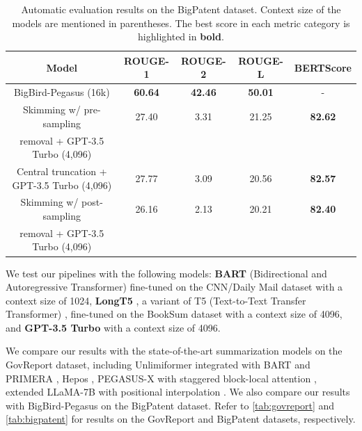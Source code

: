 	\begin{table}[!ht]
		\centering

		\begin{tabular}{c c c c c}
			\hline
			Model & ROUGE-1 & ROUGE-2 & ROUGE-L & BERTScore \\
			\hline
			BigBird-Pegasus (16k) & \textbf{60.64} & \textbf{42.46} & \textbf{50.01} & - \\
			\hline
			Skimming w/ pre-sampling & 27.40 & 3.31 & 21.25 & \textbf{82.62} \\
			removal + GPT-3.5 Turbo (4,096) & & & & \\
			Central truncation + GPT-3.5 Turbo (4,096) & 27.77 & 3.09 & 20.56 & \textbf{82.57} \\
			Skimming w/ post-sampling & 26.16 & 2.13 & 20.21 & \textbf{82.40} \\
			removal + GPT-3.5 Turbo (4,096) & & & & \\
			\hline
		\end{tabular}

		\caption{Automatic evaluation results on the BigPatent dataset. Context size of the models are
		mentioned in parentheses. The best score in each metric category is highlighted in \textbf{bold}.}
		\label{tab:bigpatent}
	\end{table}

	We test our pipelines with the following models: \textbf{BART} (Bidirectional
	and Autoregressive Transformer) \cite{lewis-etal-2020-bart} fine-tuned on the
	CNN/Daily Mail dataset \cite{nallapati2016abstractive} with a context size of 1024,
	\textbf{LongT5} \cite{guo2021longt5}, a variant of T5 (Text-to-Text Transfer
	Transformer) \cite{raffel2020exploring}, fine-tuned on the BookSum dataset with
	a context size of 4096, and \textbf{GPT-3.5 Turbo} \cite{brown2020language} with a
	context size of 4096.

	We compare our results with the state-of-the-art summarization models on the GovReport dataset,
	including Unlimiformer \cite{bertsch2023unlimiformer} integrated with BART
	\cite{lewis-etal-2020-bart} and PRIMERA \cite{beltagy2020longformer}, Hepos
	\cite{huang-etal-2021-efficient}, PEGASUS-X with staggered block-local attention
	\cite{phang2022investigating}, extended	LLaMA-7B with positional interpolation
	\cite{chen2023extending}.
	We also compare our results with BigBird-Pegasus \cite{zaheer2020big} on the BigPatent dataset.
	Refer to \autoref{tab:govreport} and \autoref{tab:bigpatent} for results on the GovReport and 
	BigPatent datasets, respectively.

